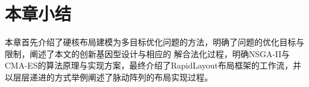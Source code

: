 













\section{本章小结}

本章首先介绍了硬核布局建模为多目标优化问题的方法，明确了问题的优化目标与限制，阐述了本文的创新基因型设计与相应的
解合法化过程，明确NSGA-II与CMA-ES的算法原理与实现方案，最终介绍了RapidLayout布局框架的工作流，并
以层层递进的方式举例阐述了脉动阵列的布局实现过程。

















































